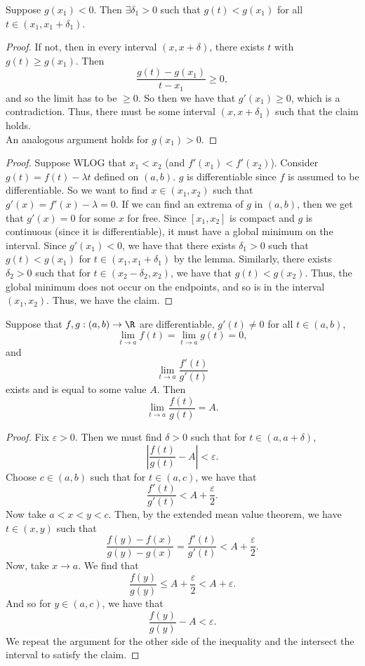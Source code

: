 \documentclass{notes}
\begin{document}
\begin{lemma}
  Suppose $g(x_1) < 0$. Then $\exists \delta_1 > 0$ such that $g(t) < g(x_1)$ for all $t\in (x_1,
  x_1 + \delta_1)$.
\end{lemma}
\begin{proof}
  If not, then in every interval $(x, x+\delta)$, there exists $t$ with $g(t) \geq g(x_1)$. Then 
  $$\frac{g(t) - g(x_1)}{t - x_1} \geq 0,$$ and so the limit has to be $\geq 0$. So then we have
  that $g'(x_1) \geq 0$, which is a contradiction. Thus, there must be some interval $(x,
  x+\delta_1)$ such that the claim holds. \\

  An analogous argument holds for $g(x_1) > 0$.
\end{proof}
\begin{proof}
  Suppose WLOG that $x_1 < x_2$ (and $f'(x_1) < f'(x_2)$). Consider $g(t) = f(t) - \lambda t$
  defined on $(a,b)$. $g$ is differentiable since $f$ is assumed to be differentiable. So we want to
  find $x\in(x_1, x_2)$ such that $g'(x) = f'(x) - \lambda = 0$. If we can find an extrema of $g$ in
  $(a,b)$, then we get that $g'(x) = 0$ for some $x$ for free. Since $[x_1, x_2]$ is compact and $g$
  is continuous (since it is differentiable), it must have a global minimum on the interval. Since
  $g'(x_1) < 0$, we have that there exists $\delta_1 > 0$ such that $g(t) < g(x_1)$ for $t\in (x_1,
  x_1+ \delta_1)$ by the lemma. Similarly, there exists $\delta_2 > 0$ such that for $t\in (x_2 -
  \delta_2, x_2)$, we have that $g(t) < g(x_2)$. Thus, the global minimum does not occur on the
  endpoints, and so is in the interval $(x_1, x_2)$. Thus, we have the claim.
\end{proof}

\begin{theorem}
  Suppose that $f,g: (a,b) \to \R$ are differentiable, $g'(t) \neq 0$ for all $t\in(a,b)$,
  $$\lim_{t\to a} f(t) = \lim_{t\to a}g(t) = 0,$$ and $$\lim_{t\to a} \frac{f'(t)}{g'(t)}$$ exists
  and is equal to some value $A$. Then $$\lim_{t\to a} \frac{f(t)}{g(t)} = A.$$ 
\end{theorem}
\begin{proof}
  Fix $\varepsilon > 0$. Then we must find $\delta > 0$ such that for $t\in (a, a + \delta)$, 
  $$\left| \frac{f(t)}{g(t)} - A \right| < \varepsilon.$$
  Choose $c\in (a,b)$ such that for $t\in (a,c)$, we have that 
  $$\frac{f'(t)}{g'(t)} < A + \frac{\varepsilon}{2}.$$
  Now take $a < x < y < c.$ Then, by the extended mean value theorem, we have $t\in (x,y)$ such that 
  $$\frac{f(y) - f(x)}{g(y) - g(x)}  = \frac{f'(t)}{g'(t)} < A + \frac{\varepsilon}{2}.$$
  Now, take $x\to a$. We find that 
  $$\frac{f(y)}{g(y)} \leq A + \frac{\varepsilon}{2} < A + \varepsilon.$$ 
  And so for $y\in(a,c)$, we have that 
  $$\frac{f(y)}{g(y)} - A < \varepsilon.$$ We repeat the argument for the other side of the
  inequality and the intersect the interval to satisfy the claim.
\end{proof}
\end{document}
